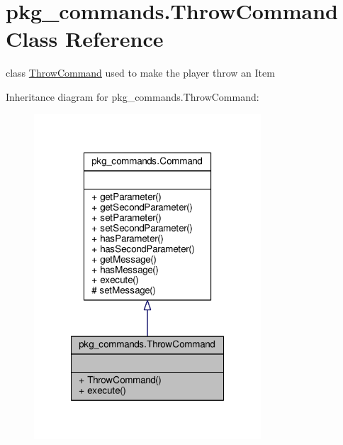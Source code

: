 \hypertarget{classpkg__commands_1_1ThrowCommand}{\section{pkg\-\_\-commands.\-Throw\-Command Class Reference}
\label{classpkg__commands_1_1ThrowCommand}
}


class \hyperlink{classpkg__commands_1_1ThrowCommand}{Throw\-Command} used to make the player throw an Item  




Inheritance diagram for pkg\-\_\-commands.\-Throw\-Command\-:\nopagebreak
\begin{figure}[H]
\begin{center}
\leavevmode
\includegraphics[width=240pt]{classpkg__commands_1_1ThrowCommand__inherit__graph}
\end{center}
\end{figure}


